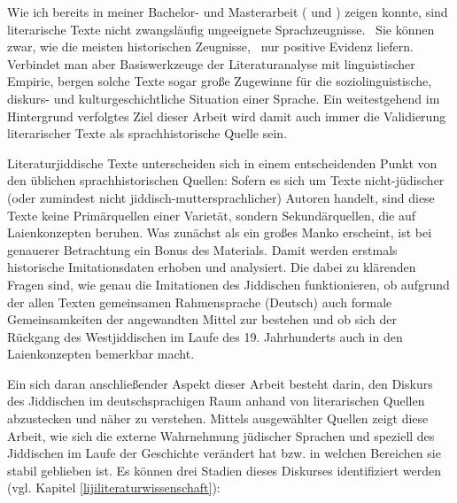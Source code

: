Wie ich bereits in meiner Bachelor- und Masterarbeit (\citealt{Schaefer2008} und \citeyear{Schaefer2010}) zeigen konnte, sind literarische %
Texte nicht zwangsläufig  ungeeignete Sprachzeugnisse. \,%
Sie können zwar, wie die meisten historischen Zeugnisse, \,%
nur positive Evidenz liefern. Verbindet man aber Basiswerkzeuge der Literaturanalyse mit linguistischer Empirie, bergen solche Texte sogar große Zugewinne für die soziolinguistische, diskurs- und kulturgeschichtliche Situation einer Sprache. Ein weitestgehend im Hintergrund verfolgtes Ziel dieser Arbeit wird damit auch immer die Validierung literarischer Texte als sprachhistorische Quelle sein.

Literaturjiddische Texte unterscheiden sich in einem entscheidenden Punkt von den üblichen sprachhistorischen Quellen: Sofern es sich um Texte nicht-jüdischer (oder zumindest nicht jiddisch-muttersprachlicher) Autoren handelt, sind diese Texte keine Primärquellen einer Varietät, sondern Sekundärquellen, die auf Laienkonzepten beruhen. Was zunächst als ein großes Manko erscheint, ist bei genauerer Betrachtung ein Bonus des Materials. Damit werden erstmals historische Imitationsdaten erhoben und analysiert. Die dabei zu klärenden Fragen sind, wie genau die Imitationen des Jiddischen funktionieren, ob aufgrund der allen Texten gemeinsamen Rahmensprache (Deutsch) auch formale Gemeinsamkeiten der angewandten Mittel zur  bestehen und ob sich der Rückgang des Westjiddischen im Laufe des 19. Jahrhunderts auch in den Laienkonzepten bemerkbar macht.

Ein sich daran anschließender Aspekt dieser Arbeit besteht darin, den Diskurs des Jiddischen im deutschsprachigen Raum anhand von literarischen Quellen abzustecken und näher zu verstehen. Mittels ausgewählter Quellen zeigt diese Arbeit, wie sich die externe Wahrnehmung jüdischer Sprachen und speziell des Jiddischen im Laufe der Geschichte verändert hat bzw. in welchen Bereichen sie stabil geblieben ist. Es können drei Stadien dieses Diskurses identifiziert werden (vgl. Kapitel \ref{lijiliteraturwissenschaft}): 



